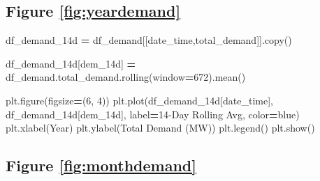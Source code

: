 \documentclass[mstat,12pt]{unswthesis}
\newenvironment{Shaded}{\begin{snugshade}}{\end{snugshade}}
\newcommand{\DecValTok}[1]{\textcolor[rgb]{0.00,0.00,0.81}{#1}}
\newcommand{\NormalTok}[1]{#1}
\newcommand{\OperatorTok}[1]{\textcolor[rgb]{0.81,0.36,0.00}{\textbf{#1}}}
\newcommand{\StringTok}[1]{\textcolor[rgb]{0.31,0.60,0.02}{#1}}
\begin{document}
\subsection*{Figure \ref{fig:yeardemand}}\label{figure-reffigyeardemand}

\begin{Shaded}
\begin{Highlighting}[]
\NormalTok{df\_demand\_14d }\OperatorTok{=}\NormalTok{ df\_demand[[}\StringTok{\textquotesingle{}date\_time\textquotesingle{}}\NormalTok{,}\StringTok{\textquotesingle{}total\_demand\textquotesingle{}}\NormalTok{]].copy()}

\NormalTok{df\_demand\_14d[}\StringTok{\textquotesingle{}dem\_14d\textquotesingle{}}\NormalTok{] }\OperatorTok{=} 
\NormalTok{    df\_demand.total\_demand.rolling(window}\OperatorTok{=}\DecValTok{672}\NormalTok{).mean()}

\NormalTok{plt.figure(figsize}\OperatorTok{=}\NormalTok{(}\DecValTok{6}\NormalTok{, }\DecValTok{4}\NormalTok{))}
\NormalTok{plt.plot(df\_demand\_14d[}\StringTok{\textquotesingle{}date\_time\textquotesingle{}}\NormalTok{], df\_demand\_14d[}\StringTok{\textquotesingle{}dem\_14d\textquotesingle{}}\NormalTok{],}
\NormalTok{    label}\OperatorTok{=}\StringTok{\textquotesingle{}14{-}Day Rolling Avg\textquotesingle{}}\NormalTok{, color}\OperatorTok{=}\StringTok{\textquotesingle{}blue\textquotesingle{}}\NormalTok{)}
\NormalTok{plt.xlabel(}\StringTok{\textquotesingle{}Year\textquotesingle{}}\NormalTok{)}
\NormalTok{plt.ylabel(}\StringTok{\textquotesingle{}Total Demand (MW)\textquotesingle{}}\NormalTok{)}
\NormalTok{plt.legend()}
\NormalTok{plt.show()}
\end{Highlighting}
\end{Shaded}

\subsection*{Figure \ref{fig:monthdemand}}\label{figure-reffigmonthdemand}
\end{document}
